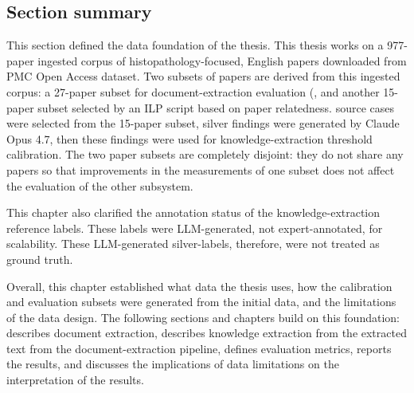 \subsection{Section summary}

This section defined the data foundation of the thesis. This thesis works on a 977-paper ingested corpus of histopathology-focused, English papers downloaded from PMC Open Access dataset. Two subsets of papers are derived from this ingested corpus: a 27-paper subset for document-extraction evaluation (, and another 15-paper subset selected by an ILP script based on paper relatedness.  source cases were selected from the 15-paper subset,  silver findings were generated by Claude Opus 4.7, then these findings were used for knowledge-extraction threshold calibration. The two paper subsets are completely disjoint: they do not share any papers so that improvements in the measurements of one subset does not affect the evaluation of the other subsystem.

This chapter also clarified the annotation status of the knowledge-extraction reference labels. These labels were LLM-generated, not expert-annotated, for scalability. These LLM-generated silver-labels, therefore, were not treated as ground truth. 

Overall, this chapter established what data the thesis uses, how the calibration and evaluation subsets were generated from the initial data, and the limitations of the data design. The following sections and chapters build on this foundation:  describes document extraction,  describes knowledge extraction from the extracted text from the document-extraction pipeline,  defines evaluation metrics,  reports the results, and  discusses the implications of data limitations on the interpretation of the results.